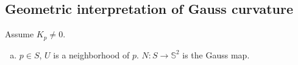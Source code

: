 \subsection{Geometric interpretation of Gauss curvature}
Assume \(K_p\neq 0\).
\begin{enumerate}[(a)]
    \item \(p\in S\), \(U\) is a neighborhood of \(p\). \(N\colon
          S\to \mathbb{S}^2\) is the Gauss map.
          \begin{center}
              \begin{tikzpicture}[x=0.75pt,y=0.75pt,yscale=-0.9,xscale=0.9]


\end{tikzpicture}
\end{center}
\end{enumerate}
